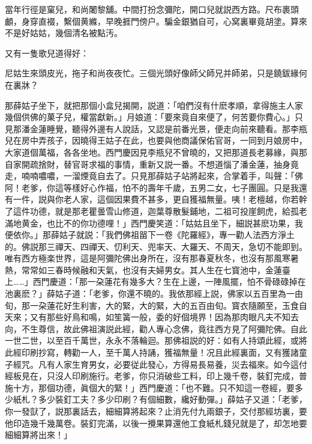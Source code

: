\begin{myquote}
當年行徑是窠兒，和尚闍黎舖。中間打扮念彌陀，開口兒就説西方路。尺布裹頭顱，身穿直裰，繫個黄縧，早晚捱門傍户。騙金銀猶自可，心窝裏畢竟胡塗。算來不是好姑姑，幾個清名被點汚。
\end{myquote}

又有一隻歌兒道得好：

\begin{myquote}
尼姑生來頭皮光，拖子和尚夜夜忙。三個光頭好像師父師兄并師弟，只是鐃鈸緣何在裏牀？
\end{myquote}

那薛姑子坐下，就把那個小盒兒揭開，説道：「咱們沒有什麽孝順，拿得施主人家幾個供佛的菓子兒，權當獻新。」月娘道：「要來竟自來便了，何苦要你費心。」只見那潘金蓮睡覺，聽得外邊有人說話，又認是前番光景，便走向前來聽看。那李瓶兒在房中弄孩子，因曉得王姑子在此，也要與他商議保佑官哥，一同到月娘房中，大家道個萬福，各各坐地。西門慶因見李瓶兒不曾曉的，又把那道長老募緣，與那自家開疏捨財，替官哥求福的事情，重新又説一番。不想道惱了潘金蓮，抽身竟走，喃喃噥噥，一溜煙竟自去了。只見那薛姑子站將起來，合掌着手，叫聲：「佛阿！老爹，你這等樣好心作福，怕不的壽年千歲，五男二女，七子團圓。只是我還有一件，説與你老人家，這個因果費不甚多，更自獲福無量。咦！老檀越，你若幹了這件功德，就是那老瞿曇雪山修道，迦葉尊散髮鋪地，二祖可投崖飼虎，給孤老滿地黄金，也比不的你功德哩！」西門慶笑道：「姑姑且坐下，細説甚麽功果，我便依你。」那薛姑子就説：「我們佛祖㽞下一卷《陀羅經》，專一勸人法西方淨土的。佛説那三禪天、四禪天、忉利天、兜率天、大羅天、不周天，急切不能即到。唯有西方極楽世界，這是阿彌陀佛出身所在，沒有那春夏秋冬，也沒有那風寒暑熱，常常如三春時候融和天氣，也沒有夫婦男女。其人生在七寳池中，金蓮臺上……」西門慶道：「那一朶蓮花有幾多大？生在上邊，一陣風擺，怕不骨碌碌掉在池裏麽？」薛姑子道：「老爹，你還不曉的。我依那經上説，佛家以五百里為一由旬，那一朶蓮花好生利害，大的緊，大的緊，大的五百由旬。寳衣隨願至，玉食自天來；又有那些好鳥和鳴，如笙簧一般，委的好個境界！因為那肉眼凡夫不知去向，不生尊信，故此佛祖演説此經，勸人專心念佛，竟往西方見了阿彌陀佛。自此一世二世，以至百千萬世，永永不落輪迴。那佛祖説的好：如有人持頌此經，或將此經印刷抄寫，轉勸一人，至千萬人持誦，獲福無量！况且此經裏面，又有獲諸童子經咒。凡有人家生育男女，必要従此發心，方得易長易養，災去福來。如今這付經板見在，只沒人印刷施行。老爹，你只消破些工料，印上幾千卷，裝釘完成，普施十方，那個功德，眞個大的緊！」西門慶道：「也不難。只不知這一卷經，要多少紙札？多少裝釘工夫？多少印刷？有個細數，纔好動彈。」薛姑子又道：「老爹，你一發獃了，説那裏話去，細細算將起來？止消先付九兩銀子，交付那經坊裏，要他印造幾千幾萬卷。裝釘完滿，以後一攪果算還他工食紙札錢兒就是了，却怎地要細細算將出來！」

